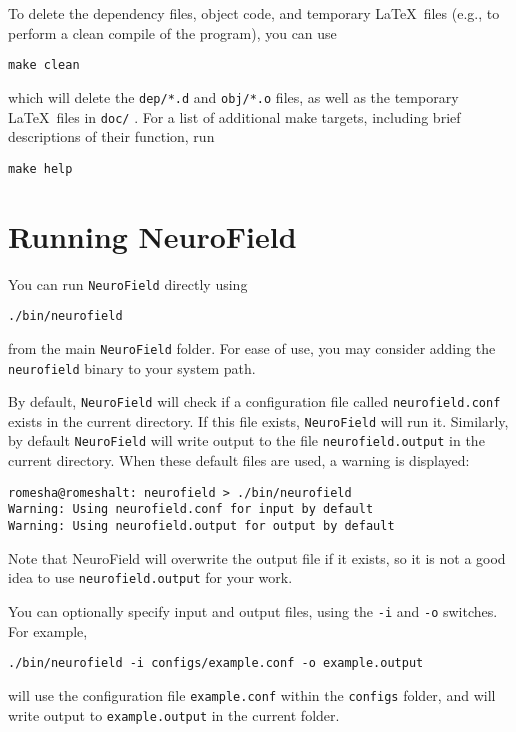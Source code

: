 \documentclass[12pt,a4paper]{article}
\newcommand{\type}[1]{{\small\small\tt #1} }
\newcommand{\NF}[0]{\type{NeuroField}}
\begin{document}
To delete the dependency files, object code, and temporary \LaTeX\ files (e.g., to perform a clean compile of the program), you can use
\begin{lstlisting}
make clean
\end{lstlisting}
which will delete the \type{dep/*.d} and \type{obj/*.o} files, as well as the temporary \LaTeX\ files in \type{doc/}. For a list of additional make targets, including brief descriptions of their function, run
\begin{lstlisting}
make help
\end{lstlisting}

\section{Running NeuroField}
\label{sec:running}
You can run \NF directly using

\begin{lstlisting}
./bin/neurofield
\end{lstlisting}

from the main \NF folder. For ease of use, you may consider adding the \type{neurofield} binary to your system path.

By default, \NF will check if a configuration file called \type{neurofield.conf} exists in the current directory. If this file exists, \NF will run it. Similarly, by default \NF will write output to the file \type{neurofield.output} in the current directory. When these default files are used, a warning is displayed:

\begin{lstlisting}
romesha@romeshalt: neurofield > ./bin/neurofield
Warning: Using neurofield.conf for input by default
Warning: Using neurofield.output for output by default
\end{lstlisting}

Note that NeuroField will overwrite the output file if it exists, so it is not a good idea to use \type{neurofield.output} for your work.

You can optionally specify input and output files, using the \type{-i} and \type{-o} switches. For example,

\begin{lstlisting}
./bin/neurofield -i configs/example.conf -o example.output
\end{lstlisting}

will use the configuration file \type{example.conf} within the \type{configs} folder, and will write output to \type{example.output} in the current folder.
\end{document}
